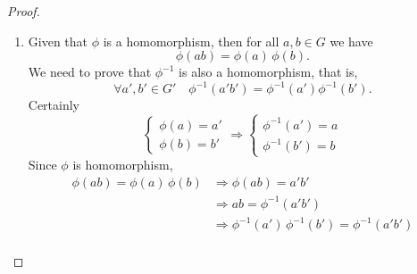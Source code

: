 \begin{proof}
    \begin{enumerate}
        \item Given that $\phi$ is a homomorphism, then for all $a,b\in G$ we have 
        \[
            \phi(ab) = \phi(a) \, \phi(b).
        \]
        We need to prove that $\phi^{-1}$ is also a homomorphism, that is, 
        \[
            \forall a',b' \in G'\quad \phi^{-1}(a'b') = \phi^{-1}(a') \phi^{-1}(b').
        \]
        Certainly
        \[
            \begin{cases}
                \phi(a) = a'\\
                \phi(b) = b'
            \end{cases}
            \Longrightarrow
            \begin{cases}
                \phi^{-1}(a') = a\\
                \phi^{-1}(b') = b
            \end{cases}
        \]
        Since $\phi$ is homomorphism, 
        \begin{align*}
            \phi(ab) = \phi(a) \, \phi(b) &\Rightarrow \phi(ab) =a'b'\\
            &\Rightarrow ab = \phi^{-1}(a'b')\\
            &\Rightarrow \phi^{-1}(a')\, \phi^{-1}(b') = \phi^{-1}(a'b')\\
        \end{align*}


\end{enumerate}
\end{proof}
